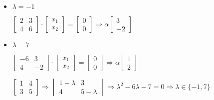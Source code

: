\documentclass[12pt]{article}
\begin{document}
\begin{itemize}
\item $\lambda = -1$
  \begin{center}
    $
    \begin{bmatrix}
      2 & 3 \\
      4 & 6 
    \end{bmatrix}\cdot
    \begin{bmatrix}
      x_1 \\ x_2
    \end{bmatrix} =
    \begin{bmatrix}
      0 \\ 0
    \end{bmatrix}\Rightarrow
    \alpha
    \begin{bmatrix}
      3 \\ -2
    \end{bmatrix}
    $
  \end{center}
\item $\lambda = 7$
  \begin{center}
    $
    \begin{bmatrix}
      -6 & 3 \\
      4 & -2
    \end{bmatrix}\cdot
    \begin{bmatrix}
      x_1 \\ x_2
    \end{bmatrix}=
    \begin{bmatrix}
      0 \\ 0
    \end{bmatrix}\Rightarrow \alpha
    \begin{bmatrix}
      1 \\ 2
    \end{bmatrix}
    $
  \end{center}
  \begin{center}
    $
    \begin{bmatrix}
      1 & 4 \\
      3 & 5
    \end{bmatrix}\Rightarrow
    \begin{vmatrix}
      1-\lambda & 3 \\
      4 & 5-\lambda
    \end{vmatrix}\Rightarrow
    \lambda^2-6\lambda-7=0\Rightarrow \lambda \in \{-1,7\}
    $
  \end{center}
\end{itemize}
\end{document}
